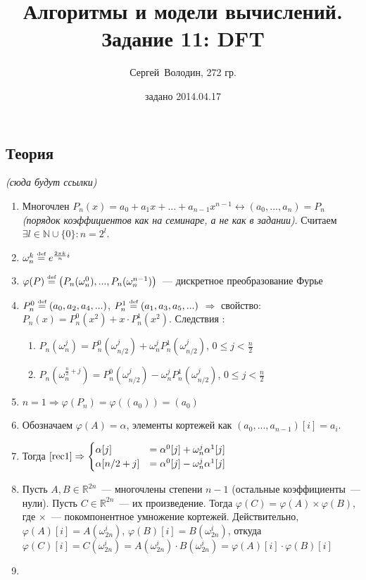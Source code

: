 \documentclass[a4paper]{article}
\date{задано 2014.04.17}
\author{Сергей~Володин, 272 гр.}
\title{Алгоритмы и модели вычислений.\\Задание 11: DFT}
\def\eqdef{\overset{\mbox{\tiny def}}{=}}
\newcommand{\NN}{\mathbb{N}}
\newcommand{\RR}{\mathbb{R}}
\begin{document}
\maketitle
\subsection*{Теория}
{\em(сюда будут ссылки)}
\begin{enumerate}
\item Многочлен $P_n(x)=a_0+a_1x+...+a_{n-1}x^{n-1}\longleftrightarrow (a_0,...,a_n)=P_n$ {\em (порядок коэффициентов как на семинаре, а не как в задании)}. Считаем $\exists l\in\NN\cup\{0\}\colon n=2^l$.
\item $\omega_n^k\eqdef e^{\frac{2\pi k}{n}i}$
\item $\varphi(P)\eqdef \big(P_n(\omega_n^0),...,P_n(\omega_n^{n-1})\big)$~--- дискретное преобразование Фурье
\item $P_n^0\eqdef (a_0,a_2,a_4,...)$, $P_n^1\eqdef (a_1,a_3,a_5,...)$ $\Rightarrow$ свойство: $P_n(x)=P^0_n(x^2)+x\cdot P^1_n(x^2)$. Следствия \label{rec1}:\begin{enumerate}
\item $P_n(\omega_n^j)=P_n^0(\omega_{n/2}^j)+\omega_n^j P_n^1(\omega_{n/2}^j)$, $0\leqslant j<\frac{n}{2}$
\item $P_n(\omega_n^{\frac{n}{2}+j})=P_n^0(\omega_{n/2}^j)- \omega_n^jP_n^1(\omega_{n/2}^j)$, $0\leqslant j < \frac{n}{2}$
\end{enumerate}
\item \label{n1} $n=1\Rightarrow \varphi(P_n)=\varphi((a_0))=(a_0)$ 
\item Обозначаем $\varphi(A)=\alpha$, элементы кортежей как $(a_0,...,a_{n-1})[i]=a_i$.
\item Тогда $\ref{rec1}\Rightarrow\begin{cases}
\alpha[j]&=\alpha^0[j]+\omega_n^j\alpha^1[j]\\
\alpha[n/2+j]&=\alpha^0[j]-\omega_n^j\alpha^1[j]
\end{cases}$
\item \label{mult} Пусть $A,B\in\RR^{2n}$~--- многочлены степени $n-1$ (остальные коэффициенты~--- нули). Пусть $C\in\RR^{2n}$~--- их произведение. Тогда $\varphi(C)=\varphi(A)\times\varphi(B)$, где $\times$~--- покомпонентное умножение кортежей. Действительно, $\varphi(A)[i]=A(\omega_{2n}^i)$, $\varphi(B)[i]=B(\omega_{2n}^i)$, откуда $\varphi(C)[i]=C(\omega_{2n}^i)=A(\omega_{2n}^i)\cdot B(\omega_{2n}^i)=\varphi(A)[i]\cdot\varphi(B)[i]$
\item \label{inverse}
\end{enumerate}
\end{document}

